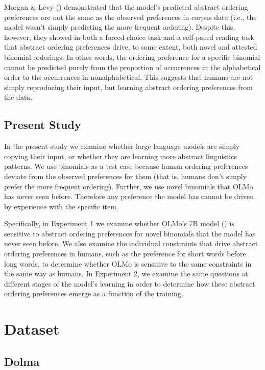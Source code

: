 \documentclass[
  nottoc]{article}
\begin{document}
Morgan \& Levy ()
demonstrated that the model's predicted abstract ordering preferences
are not the same as the observed preferences in corpus data (i.e., the
model wasn't simply predicting the more frequent ordering). Despite
this, however, they showed in both a forced-choice task and a self-paced
reading task that abstract ordering preferences drive, to some extent,
both novel and attested binomial orderings. In other words, the ordering
preference for a specific binomial cannot be predicted purely from the
proportion of occurrences in the alphabetical order to the occurrences
in nonalphabetical. This suggests that humans are not simply reproducing
their input, but learning abstract ordering preferences from the data.

\subsection{Present Study}\label{present-study}

In the present study we examine whether large language models are simply
copying their input, or whether they are learning more abstract
linguistics patterns. We use binomials as a test case because human
ordering preferences deviate from the observed preferences for them
(that is, humans don't simply prefer the more frequent ordering).
Further, we use novel binomials that OLMo has never seen before.
Therefore any preference the model has cannot be driven by experience
with the specific item.

Specifically, in Experiment 1 we examine whether OLMo's 7B model
() is sensitive to abstract ordering preferences for novel binomials
that the model has never seen before. We also examine the individual
constraints that drive abstract ordering preferences in humans, such as
the preference for short words before long words, to determine whether
OLMo is sensitive to the same constraints in the same way as humans. In
Experiment 2, we examine the same questions at different stages of the
model's learning in order to determine how these abstract ordering
preferences emerge as a function of the training.

\section{Dataset}\label{dataset}

\subsection{Dolma}\label{dolma}
\end{document}
